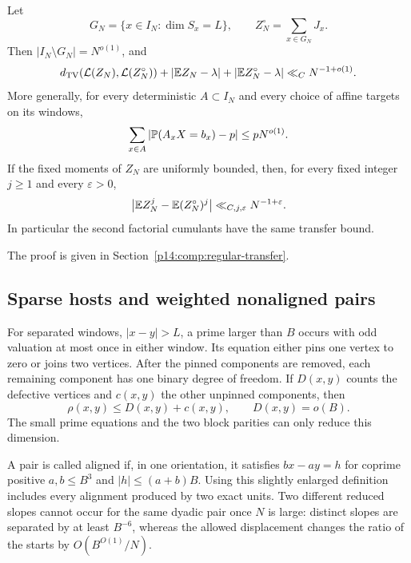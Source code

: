 \begin{proposition}\label{p1:arith:core}
Let
\[
 G_N=\{x\in I_N:\dim S_x=L\},\qquad Z_N^\circ=\sum_{x\in G_N}J_x.
\]
Then $|I_N\setminus G_N|=N^{o(1)}$, and
\begin{equation}\label{p1:arith:coretransfer}
 d_{\rm TV}(\Law(Z_N),\Law(Z_N^\circ))+
 |\E Z_N-\lambda|+|\E Z_N^\circ-\lambda|
 \ll_C N^{-1+o(1)}.
\end{equation}
More generally, for every deterministic $A\subset I_N$ and every choice of
affine targets on its windows,
\begin{equation}\label{p1:arith:marginalsum}
 \sum_{x\in A}|\P(A_xX=b_x)-p|\leq pN^{o(1)}.
\end{equation}
If the fixed moments of $Z_N$ are uniformly bounded, then, for every fixed
integer $j\geq1$ and every $\varepsilon>0$,
\begin{equation}\label{p1:arith:momenttransfer}
 \big|\E Z_N^j-\E(Z_N^\circ)^j\big|
 \ll_{C,j,\varepsilon}N^{-1+\varepsilon}.
\end{equation}
In particular the second factorial cumulants have the same transfer bound.
\end{proposition}

The proof is given in Section~\ref{p14:comp:regular-transfer}.

\subsection{Sparse hosts and weighted nonaligned pairs}

For separated windows, $|x-y|>L$, a prime larger than $B$ occurs with odd
valuation at most once in either window.  Its equation either pins one
vertex to zero or joins two vertices.  After the pinned components are
removed, each remaining component has one binary degree of freedom.  If
$D(x,y)$ counts the defective vertices and $c(x,y)$ the other unpinned
components, then
\begin{equation}\label{p1:arith:graphbound}
 \rho(x,y)\leq D(x,y)+c(x,y),\qquad D(x,y)=o(B).
\end{equation}
The small prime equations and the two block parities can only reduce this
dimension.

A pair is called aligned if, in one orientation, it satisfies
$bx-ay=h$ for coprime positive $a,b\leq B^3$ and
$|h|\leq(a+b)B$.  Using this slightly enlarged definition includes every
alignment produced by two exact units.  Two different reduced slopes cannot
occur for the same dyadic pair once $N$ is large: distinct slopes are separated
by at least $B^{-6}$, whereas the allowed displacement changes the ratio of
the starts by $O(B^{O(1)}/N)$.

